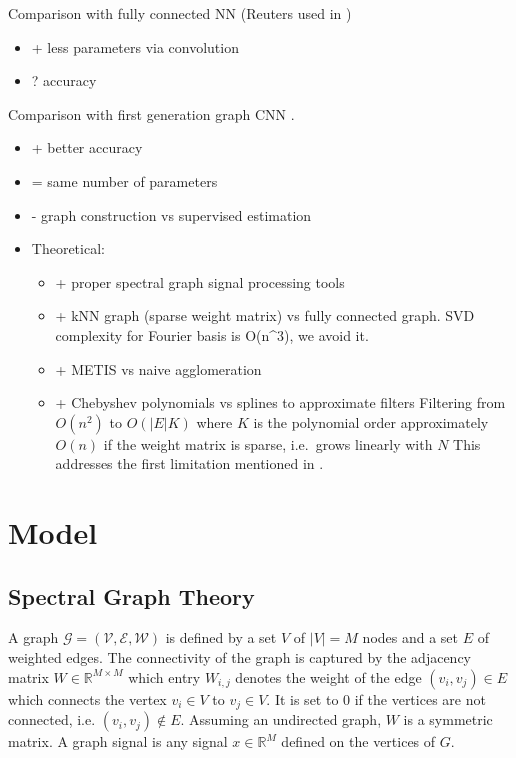 \documentclass{article}
\newcommand{\G}{\mathcal{G}}
\newcommand{\V}{\mathcal{V}}
\newcommand{\E}{\mathcal{E}}
\newcommand{\W}{\mathcal{W}}
\newcommand{\R}{\mathbb{R}}
\begin{document}
Comparison with fully connected NN (Reuters used in
\citep{srivastava_dropout_2014})

\begin{itemize}
\item
  + less parameters via convolution
\item
  ? accuracy
\end{itemize}

Comparison with first generation graph CNN \citep{henaff_deep_2015}.

\begin{itemize}
\item
  + better accuracy
\item
  = same number of parameters
\item
  - graph construction vs supervised estimation
\item
  Theoretical:

  \begin{itemize}
  \item
    + proper spectral graph signal processing tools
  \item
    + kNN graph (sparse weight matrix) vs fully connected graph. SVD
    complexity for Fourier basis is O(n\^{}3), we avoid it.
  \item
    + METIS vs naive agglomeration
  \item
    + Chebyshev polynomials vs splines to approximate filters Filtering
    from \(O(n^2)\) to \(O(|E| K)\) where \(K\) is the polynomial order
    approximately \(O(n)\) if the weight matrix is sparse, i.e.~grows
    linearly with \(N\) This addresses the first limitation mentioned in
    \citep{henaff_deep_2015}.
  \end{itemize}
\end{itemize}

\section{Model}\label{model}

\subsection{Spectral Graph Theory}\label{spectral-graph-theory}

A graph \(\G = (\V, \E, \W)\) is defined by a set \(V\) of \(|V| = M\)
nodes and a set \(E\) of weighted edges. The connectivity of the graph
is captured by the adjacency matrix \(W \in \R^{M \times M}\) which
entry \(W_{i,j}\) denotes the weight of the edge \((v_i, v_j) \in E\)
which connects the vertex \(v_i \in V\) to \(v_j \in V\). It is set to
\(0\) if the vertices are not connected, i.e. \((v_i, v_j) \notin E\).
Assuming an undirected graph, \(W\) is a symmetric matrix. A graph
signal is any signal \(x \in \R^M\) defined on the vertices of \(G\).
\end{document}
